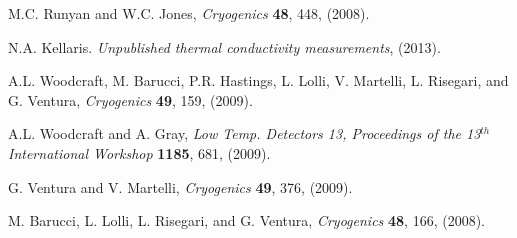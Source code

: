 \documentclass[final]{svjour2}
\begin{document}
\begin{thebibliography}{99}
M.C. Runyan and W.C. Jones, {\it Cryogenics} \textbf{48}, 448, (2008).

N.A. Kellaris. {\it Unpublished thermal conductivity measurements}, (2013).

A.L. Woodcraft, M. Barucci, P.R. Hastings, L. Lolli, V. Martelli, L. Risegari, and G. Ventura, {\it Cryogenics} \textbf{49}, 159, (2009).

A.L. Woodcraft and A. Gray, {\it Low Temp. Detectors 13, Proceedings of the 13$^{th}$ International Workshop} \textbf{1185}, 681, (2009).

G. Ventura and V. Martelli, {\it Cryogenics} \textbf{49}, 376, (2009).

M. Barucci, L. Lolli, L. Risegari, and G. Ventura, {\it Cryogenics} \textbf{48}, 166, (2008).

\end{thebibliography}
\end{document}
